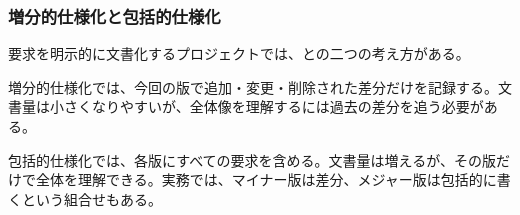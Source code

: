 \subsubsection{増分的仕様化と包括的仕様化}

要求を明示的に文書化するプロジェクトでは、との二つの考え方がある。

増分的仕様化では、今回の版で追加・変更・削除された差分だけを記録する。文書量は小さくなりやすいが、全体像を理解するには過去の差分を追う必要がある。

包括的仕様化では、各版にすべての要求を含める。文書量は増えるが、その版だけで全体を理解できる。実務では、マイナー版は差分、メジャー版は包括的に書くという組合せもある。
